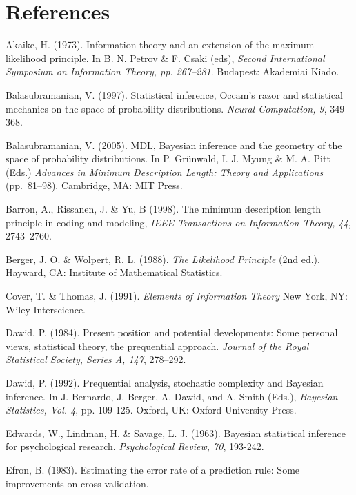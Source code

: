 \documentclass{elsart}
\begin{document}
\section*{References}
\vspace*{2pt}
\begin{list}{}{\setlength{\leftmargin}{12pt}\setlength{\itemindent}{-12pt}\setlength{\parsep}{0pt}}
\item Akaike, H. (1973). Information theory and an extension of the maximum likelihood principle.
In B. N. Petrov \& F. Csaki (eds), {\it Second International Symposium on Information Theory, pp.
267--281}. Budapest: Akademiai Kiado.
\item Balasubramanian, V. (1997). Statistical inference, Occam's razor and statistical mechanics
on the space of probability distributions. {\it Neural Computation, 9}, 349--368.
\item Balasubramanian, V. (2005). MDL, Bayesian inference and the geometry of the space of probability
distributions. In P. Gr\"{u}nwald, I. J. Myung \& M. A. Pitt (Eds.) {\it Advances in Minimum
Description Length: Theory and Applications} (pp.~81--98). Cambridge, MA: MIT Press.
\item Barron, A., Rissanen, J. \& Yu, B (1998). The minimum description length principle
  in coding and modeling, {\em IEEE Transactions on Information Theory, 44}, 2743--2760.
\item Berger, J. O. \& Wolpert, R. L. (1988). {\it The Likelihood Principle} (2nd ed.). Hayward, CA:
Institute of Mathematical Statistics.
\item Cover, T. \& Thomas, J. (1991). {\it Elements of Information Theory} New York, NY: Wiley Interscience.
\item Dawid, P. (1984). Present position and potential developments: Some personal views, statistical theory,
the prequential approach. {\it Journal of the Royal Statistical Society, Series A, 147}, 278--292.
\item Dawid, P. (1992). Prequential analysis, stochastic complexity and Bayesian inference. In J.
Bernardo, J. Berger, A. Dawid, and A. Smith (Eds.), {\it Bayesian Statistics, Vol. 4}, pp.
109-125. Oxford, UK: Oxford University Press.
\item Edwards, W., Lindman, H. \& Savage, L. J. (1963). Bayesian statistical inference for psychological
research. {\it Psychological Review, 70}, 193-242.
\item Efron, B. (1983). Estimating the error rate of a prediction rule: Some improvements on cross-validation.

\end{list}
\end{document}
